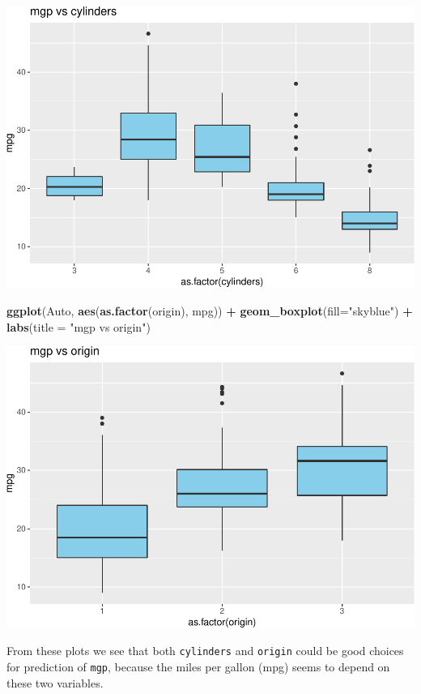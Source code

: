 \documentclass[]{article}
\newenvironment{Shaded}{\begin{snugshade}}{\end{snugshade}}
\newcommand{\KeywordTok}[1]{\textcolor[rgb]{0.13,0.29,0.53}{\textbf{#1}}}
\newcommand{\DataTypeTok}[1]{\textcolor[rgb]{0.13,0.29,0.53}{#1}}
\newcommand{\StringTok}[1]{\textcolor[rgb]{0.31,0.60,0.02}{#1}}
\newcommand{\OperatorTok}[1]{\textcolor[rgb]{0.81,0.36,0.00}{\textbf{#1}}}
\newcommand{\NormalTok}[1]{#1}
\begin{document}
\includegraphics{RecEx2-sol_files/figure-latex/unnamed-chunk-8-1.pdf}

\begin{Shaded}
\begin{Highlighting}[]
\KeywordTok{ggplot}\NormalTok{(Auto, }\KeywordTok{aes}\NormalTok{(}\KeywordTok{as.factor}\NormalTok{(origin), mpg)) }\OperatorTok{+}\StringTok{ }\KeywordTok{geom_boxplot}\NormalTok{(}\DataTypeTok{fill=}\StringTok{"skyblue"}\NormalTok{) }\OperatorTok{+}\StringTok{ }\KeywordTok{labs}\NormalTok{(}\DataTypeTok{title =} \StringTok{"mgp vs origin"}\NormalTok{) }
\end{Highlighting}
\end{Shaded}

\includegraphics{RecEx2-sol_files/figure-latex/unnamed-chunk-8-2.pdf}

From these plots we see that both \texttt{cylinders} and \texttt{origin}
could be good choices for prediction of \texttt{mgp}, because the miles
per gallon (mpg) seems to depend on these two variables.
\end{document}
